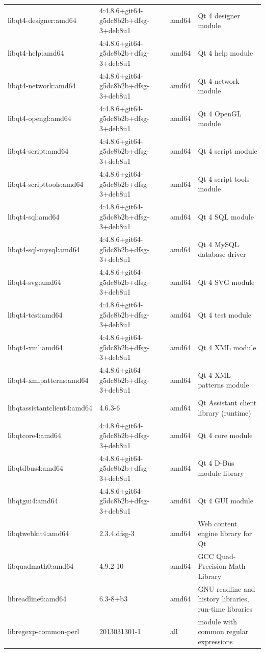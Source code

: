 \documentclass[a4paper,10pt]{article}
\begin{document}
\begin{appendices}
{\begin{longtable}{p{3.25cm}@{\hspace{0.25cm}}p{4cm}@{\hspace{0.25cm}}l@{\hspace{0.25cm}}p{7cm}}
libqt4-designer:amd64	&	4:4.8.6+git64-g5dc8b2b+dfsg-3+deb8u1	&	amd64	&	Qt 4 designer module	\\
libqt4-help:amd64	&	4:4.8.6+git64-g5dc8b2b+dfsg-3+deb8u1	&	amd64	&	Qt 4 help module	\\
libqt4-network:amd64	&	4:4.8.6+git64-g5dc8b2b+dfsg-3+deb8u1	&	amd64	&	Qt 4 network module	\\
libqt4-opengl:amd64	&	4:4.8.6+git64-g5dc8b2b+dfsg-3+deb8u1	&	amd64	&	Qt 4 OpenGL module	\\
libqt4-script:amd64	&	4:4.8.6+git64-g5dc8b2b+dfsg-3+deb8u1	&	amd64	&	Qt 4 script module	\\
libqt4-scripttools:amd64	&	4:4.8.6+git64-g5dc8b2b+dfsg-3+deb8u1	&	amd64	&	Qt 4 script tools module	\\
libqt4-sql:amd64	&	4:4.8.6+git64-g5dc8b2b+dfsg-3+deb8u1	&	amd64	&	Qt 4 SQL module	\\
libqt4-sql-mysql:amd64	&	4:4.8.6+git64-g5dc8b2b+dfsg-3+deb8u1	&	amd64	&	Qt 4 MySQL database driver	\\
libqt4-svg:amd64	&	4:4.8.6+git64-g5dc8b2b+dfsg-3+deb8u1	&	amd64	&	Qt 4 SVG module	\\
libqt4-test:amd64	&	4:4.8.6+git64-g5dc8b2b+dfsg-3+deb8u1	&	amd64	&	Qt 4 test module	\\
libqt4-xml:amd64	&	4:4.8.6+git64-g5dc8b2b+dfsg-3+deb8u1	&	amd64	&	Qt 4 XML module	\\
libqt4-xmlpatterns:amd64	&	4:4.8.6+git64-g5dc8b2b+dfsg-3+deb8u1	&	amd64	&	Qt 4 XML patterns module	\\
libqtassistantclient4:amd64	&	4.6.3-6	&	amd64	&	Qt Assistant client library (runtime)	\\
libqtcore4:amd64	&	4:4.8.6+git64-g5dc8b2b+dfsg-3+deb8u1	&	amd64	&	Qt 4 core module	\\
libqtdbus4:amd64	&	4:4.8.6+git64-g5dc8b2b+dfsg-3+deb8u1	&	amd64	&	Qt 4 D-Bus module library	\\
libqtgui4:amd64	&	4:4.8.6+git64-g5dc8b2b+dfsg-3+deb8u1	&	amd64	&	Qt 4 GUI module	\\
libqtwebkit4:amd64	&	2.3.4.dfsg-3	&	amd64	&	Web content engine library for Qt	\\
libquadmath0:amd64	&	4.9.2-10	&	amd64	&	GCC Quad-Precision Math Library	\\
libreadline6:amd64	&	6.3-8+b3	&	amd64	&	GNU readline and history libraries, run-time libraries	\\
libregexp-common-perl	&	2013031301-1	&	all	&	module with common regular expressions	\\

\end{longtable}}
\end{appendices}
\end{document}
